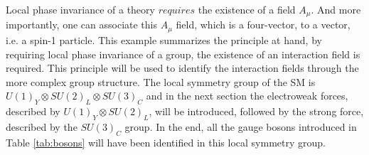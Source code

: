 Local phase invariance of a theory $requires$ the existence of a field $A_{\mu}$. 
And more importantly, one can associate this $A_{\mu}$ field, which is a four-vector, to a vector, i.e. a spin-1 particle. 
This example summarizes the principle at hand, by requiring local phase invariance of a group, the existence of an interaction field is required. 
This principle will be used to identify the interaction fields through the more complex group structure. 
\newpara
\noindent\justify
The local symmetry group of the SM is $U(1)_{Y}\otimes SU(2)_{L}\otimes SU(3)_{C}$ and in the next section the electroweak forces, described by $U(1)_{Y}\otimes SU(2)_{L}$, will be introduced, followed by the strong force, described by the $SU(3)_{C}$ group. 
In the end, all the gauge bosons introduced in Table \ref{tab:bosons} will have been identified in this local symmetry group. 
